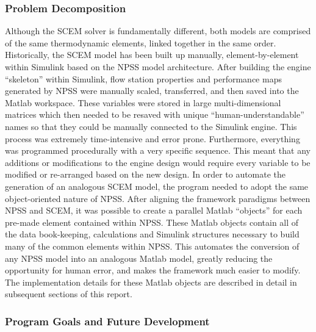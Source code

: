 \documentclass[heading.tex]{subfiles}
\begin{document}
\subsubsection{Problem Decomposition}

Although the SCEM solver is fundamentally different, both models are comprised of the same thermodynamic elements, linked together in the same order. Historically, the SCEM model has been built up manually, element-by-element within Simulink based on the NPSS model architecture. After building the engine “skeleton” within Simulink, flow station properties and performance maps generated by NPSS were manually scaled, transferred, and then saved into the Matlab workspace. These variables were stored in large multi-dimensional matrices which then needed to be resaved with unique “human-understandable” names so that they could be manually connected to the Simulink engine. This process was extremely time-intensive and error prone. Furthermore, everything was programmed procedurally with a very specific sequence. This meant that any additions or modifications to the engine design would require every variable to be modified or re-arranged based on the new design. In order to automate the generation of an analogous SCEM model, the program needed to adopt the same object-oriented nature of NPSS. After aligning the framework paradigms between NPSS and SCEM, it was possible to create a parallel Matlab “objects” for each pre-made element contained within NPSS. These Matlab objects contain all of the data book-keeping, calculations and Simulink structures necessary to build many of the common elements within NPSS. This automates the conversion of any NPSS model into an analogous Matlab model, greatly reducing the opportunity for human error, and makes the framework much easier to modify. The implementation details for these Matlab objects are described in detail in subsequent sections of this report.	


\subsubsection{Program Goals and Future Development}
\end{document}
